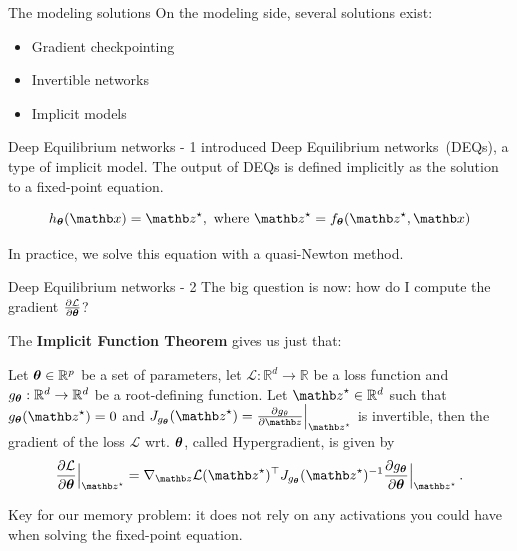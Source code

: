 \begin{frame}{The modeling solutions}
    On the modeling side, several solutions exist:
    \begin{itemize}[<+->]
        \item Gradient checkpointing~\citep{Chen2016TrainingCost}
        \item Invertible networks~\citep{Gomez2017TheActivations,Sander2021MomentumNetworks}
        \item Implicit models~\citep{Chen2018NeuralEquations,Bai2019DeepModels}
    \end{itemize}
\end{frame}

\begin{frame}{Deep Equilibrium networks - 1}
    \citet{Bai2019DeepModels} introduced Deep Equilibrium networks~(DEQs), a type of implicit model.
    The output of DEQs is defined implicitly as the solution to a fixed-point equation.

    \begin{equation*}
        h_{\thetab}(\xb) = \zb^\star, \text{ where } \zb^\star = f_\thetab(\zb^\star, \xb)
    \end{equation*}

    \pause

    In practice, we solve this equation with a quasi-Newton method.
\end{frame}

\begin{frame}{Deep Equilibrium networks - 2}
    The big question is now: how do I compute the gradient $\frac{\partial \mathcal{L}}{\partial {\ensuremath{\boldsymbol{\theta}}}}$?
    \pause

    The \textbf{Implicit Function Theorem} gives us just that:
    \begin{theorem}
        Let ${\boldsymbol{\theta}} \in \mathbb{R}^p$ be a set of parameters, let $\mathcal{L}: \mathbb{R}^d \rightarrow \mathbb{R}$ be a loss function and $g_{{\boldsymbol{\theta}}}: \mathbb{R}^d \rightarrow \mathbb{R}^d$ be a root-defining function.
Let $\zb^\star \in  \mathbb{R}^d$ such that $g_{\thetab}(\zb^\star) = 0$ and $J_{g_{\thetab}}(\zb^\star) = \frac{\partial g_{\theta}}{\partial \zb}\Bigr|_{\zb^\star}$ is invertible, then the gradient of the loss $\mathcal{L}$ wrt. ${\boldsymbol{\theta}}$, called Hypergradient, is given by
\begin{equation*}
    \frac{\partial \mathcal{L}}{\partial \thetab}\Bigr|_{\zb^\star} = \nabla_\zb \mathcal{L}(\zb^\star)^\top J_{g_{\thetab}}(\zb^\star)^{-1} \frac{\partial g_{\thetab}}{\partial \thetab}\Bigr|_{\zb^\star} \, .
\end{equation*}
    \end{theorem}
    \pause

    Key for our memory problem: it does not rely on any activations you could have when solving the fixed-point equation.
\end{frame}

